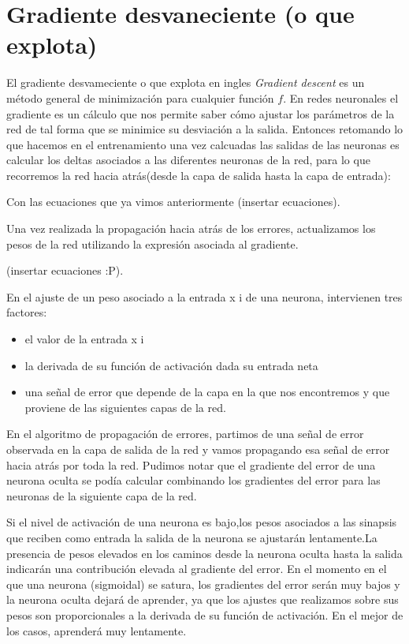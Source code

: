\section{Gradiente desvaneciente (o que explota)}

El gradiente desvameciente o que explota en ingles \emph{Gradient descent} es un método general de minimización para cualquier función $f$. En redes neuronales el gradiente es un cálculo que nos permite saber cómo ajustar los parámetros de la red de tal forma que se minimice su desviación a la salida.
Entonces retomando lo que hacemos en el entrenamiento una vez calcuadas las salidas de las neuronas es calcular los deltas asociados a las diferentes neuronas de la red, para lo que recorremos la red hacia atrás(desde la capa de salida hasta la capa de entrada):

Con las ecuaciones que ya vimos anteriormente (insertar ecuaciones).

Una vez realizada la propagación hacia atrás de los errores, actualizamos los pesos de la red utilizando la expresión asociada al gradiente.

(insertar ecuaciones :P).

En el ajuste de un peso asociado a la entrada x i de una neurona, intervienen tres factores: 
\begin{itemize}
 \item el valor de la entrada x i
 \item la derivada de su función de activación dada su entrada neta
 \item una señal de error que depende de la capa en la que nos encontremos y que proviene de las
siguientes capas de la red.
\end{itemize}

En el algoritmo de propagación de errores, partimos de una señal de error observada en la capa de salida de la red y vamos propagando esa señal de error hacia atrás por toda la red. Pudimos notar que el gradiente del error de una neurona oculta se podía calcular combinando los gradientes del error para las neuronas de la siguiente capa de la red.

Si el nivel de activación de una neurona es bajo,los pesos asociados a las sinapsis que reciben como entrada la salida
de la neurona se ajustarán lentamente.La presencia de pesos elevados en los caminos desde la neurona oculta
hasta la salida indicarán una contribución elevada al gradiente del error. En el momento en el que una neurona (sigmoidal) se satura, los gradientes del error serán muy bajos y la neurona oculta dejará de aprender, ya que los ajustes que realizamos sobre sus pesos son proporcionales a la derivada de su función de activación. En el mejor de los casos, aprenderá muy lentamente.

